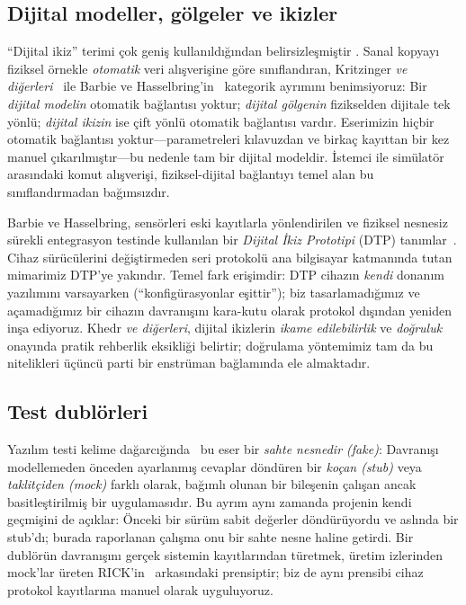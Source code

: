 \documentclass[9pt,twocolumn,a4paper]{extarticle}
\begin{document}
\subsection{Dijital modeller, gölgeler ve ikizler}
``Dijital ikiz'' terimi çok geniş kullanıldığından belirsizleşmiştir \cite{tao2019dt,rasheed2020dt}. Sanal kopyayı fiziksel örnekle \emph{otomatik} veri alışverişine göre sınıflandıran, Kritzinger \emph{ve diğerleri}~\cite{kritzinger2018dt} ile Barbie ve Hasselbring'in~\cite{barbie2024dtp} kategorik ayrımını benimsiyoruz: Bir \emph{dijital modelin} otomatik bağlantısı yoktur; \emph{dijital gölgenin} fizikselden dijitale tek yönlü; \emph{dijital ikizin} ise çift yönlü otomatik bağlantısı vardır. Eserimizin hiçbir otomatik bağlantısı yoktur---parametreleri kılavuzdan ve birkaç kayıttan bir kez manuel çıkarılmıştır---bu nedenle tam bir dijital modeldir. İstemci ile simülatör arasındaki komut alışverişi, fiziksel-dijital bağlantıyı temel alan bu sınıflandırmadan bağımsızdır.

Barbie ve Hasselbring, sensörleri eski kayıtlarla yönlendirilen ve fiziksel nesnesiz sürekli entegrasyon testinde kullanılan bir \emph{Dijital İkiz Prototipi} (DTP) tanımlar~\cite{barbie2024dtp,barbie2023smartfarming}. Cihaz sürücülerini değiştirmeden seri protokolü ana bilgisayar katmanında tutan mimarimiz DTP'ye yakındır. Temel fark erişimdir: DTP cihazın \emph{kendi} donanım yazılımını varsayarken (``konfigürasyonlar eşittir''); biz tasarlamadığımız ve açamadığımız bir cihazın davranışını kara-kutu olarak protokol dışından yeniden inşa ediyoruz. Khedr \emph{ve diğerleri}, dijital ikizlerin \emph{ikame edilebilirlik} ve \emph{doğruluk}~\cite{khedr2026sos} onayında pratik rehberlik eksikliği belirtir; doğrulama yöntemimiz tam da bu nitelikleri üçüncü parti bir enstrüman bağlamında ele almaktadır.

\subsection{Test dublörleri}
Yazılım testi kelime dağarcığında~\cite{meszaros2007xunit,fowler2007mocks} bu eser bir \emph{sahte nesnedir (fake)}: Davranışı modellemeden önceden ayarlanmış cevaplar döndüren bir \emph{koçan (stub)} veya \emph{taklitçiden (mock)} farklı olarak, bağımlı olunan bir bileşenin çalışan ancak basitleştirilmiş bir uygulamasıdır. Bu ayrım aynı zamanda projenin kendi geçmişini de açıklar: Önceki bir sürüm sabit değerler döndürüyordu ve aslında bir stub'dı; burada raporlanan çalışma onu bir sahte nesne haline getirdi. Bir dublörün davranışını gerçek sistemin kayıtlarından türetmek, üretim izlerinden mock'lar üreten RICK'in~\cite{tiwari2023rick} arkasındaki prensiptir; biz de aynı prensibi cihaz protokol kayıtlarına manuel olarak uyguluyoruz.
\end{document}
